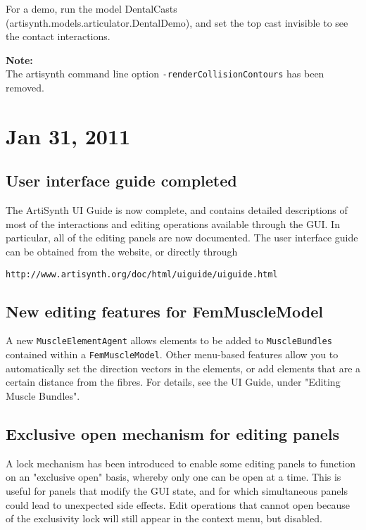 \documentclass{article}
\begin{document}
\begin{sideblock}
For a demo, run the model {\sf DentalCasts}
(artisynth.models.articulator.DentalDemo), and set the top cast
invisible to see the contact interactions.
\end{sideblock}

\begin{sideblock}
{\bf Note:}\\
The artisynth command line option {\tt -renderCollisionContours} has
been removed.
\end{sideblock}

\section*{Jan 31, 2011}

\subsection*{User interface guide completed}

The ArtiSynth UI Guide is now complete, and contains detailed
descriptions of most of the interactions and editing operations
available through the GUI. In particular, all of the editing panels
are now documented. The user interface guide can be obtained from the
website, or directly through

\begin{verbatim}
http://www.artisynth.org/doc/html/uiguide/uiguide.html
\end{verbatim}

\subsection*{New editing features for FemMuscleModel}

A new {\tt MuscleElementAgent} allows elements to be added to {\tt MuscleBundles}
contained within a {\tt FemMuscleModel}. Other menu-based features allow you
to automatically set the direction vectors in the elements, or add
elements that are a certain distance from the fibres. For details,
see the UI Guide, under "Editing Muscle Bundles".

\subsection*{Exclusive open mechanism for editing panels}

A lock mechanism has been introduced to enable some editing panels to
function on an "exclusive open" basis, whereby only one can be open at
a time. This is useful for panels that modify the GUI state, and for
which simultaneous panels could lead to unexpected side effects.
Edit operations that cannot open because of the exclusivity lock will
still appear in the context menu, but disabled. 
\end{document}

